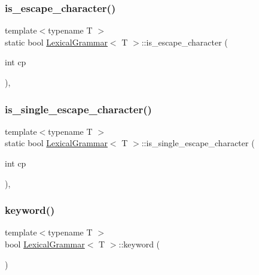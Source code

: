 \mbox{\label{class_lexical_grammar_a6c6aad40b7a73bc8e431906738311d66}} 
\subsubsection{\texorpdfstring{is\+\_\+escape\+\_\+character()}{is\_escape\_character()}}
{\footnotesize\ttfamily template$<$typename T $>$ \\
static bool \hyperlink{class_lexical_grammar}{Lexical\+Grammar}$<$ T $>$\+::is\+\_\+escape\+\_\+character (\begin{DoxyParamCaption}\item[{int}]{cp }\end{DoxyParamCaption})\hspace{0.3cm}{\ttfamily [inline]}, {\ttfamily [static]}}

\mbox{\label{class_lexical_grammar_a1648e4991fdcbb71709e73924171a92c}} 
\subsubsection{\texorpdfstring{is\+\_\+single\+\_\+escape\+\_\+character()}{is\_single\_escape\_character()}}
{\footnotesize\ttfamily template$<$typename T $>$ \\
static bool \hyperlink{class_lexical_grammar}{Lexical\+Grammar}$<$ T $>$\+::is\+\_\+single\+\_\+escape\+\_\+character (\begin{DoxyParamCaption}\item[{int}]{cp }\end{DoxyParamCaption})\hspace{0.3cm}{\ttfamily [inline]}, {\ttfamily [static]}}

\mbox{\label{class_lexical_grammar_a609dc2ff60d85011034954b805ebd077}} 
\subsubsection{\texorpdfstring{keyword()}{keyword()}}
{\footnotesize\ttfamily template$<$typename T $>$ \\
bool \hyperlink{class_lexical_grammar}{Lexical\+Grammar}$<$ T $>$\+::keyword (\begin{DoxyParamCaption}{ }\end{DoxyParamCaption})\hspace{0.3cm}{\ttfamily [inline]}}

